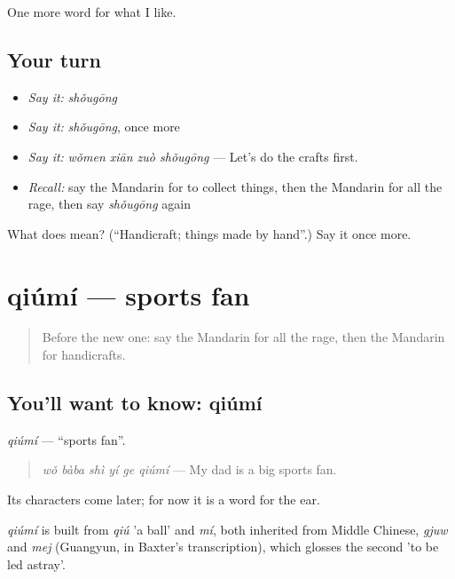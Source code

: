 \begin{grammarlens}[title={What you've built}]
One more word for what I like.
\end{grammarlens}

\subsection*{Your turn}
\begin{itemize}
\raggedright
  \item \emph{Say it:} \emph{shǒugōng}
  \item \emph{Say it:} \emph{shǒugōng}, once more
  \item \emph{Say it:} \emph{wǒmen xiān zuò shǒugōng} — Let's do the crafts first.
  \item \emph{Recall:} say the Mandarin for to collect things, then the Mandarin for all the rage, then say \emph{shǒugōng} again
\end{itemize}

\begin{tcolorbox}[breakable,colback=teal!4,colframe=teal!35!black,title={Before you move on}]
What does  mean? (\textquotedblleft{}Handicraft; things made by hand\textquotedblright{}.) Say it once more.
\end{tcolorbox}
\section[qiúmí]{qiúmí — sports fan}

\label{lesson:ZH-C274-qiumi}



\begin{quote}
Before the new one: say the Mandarin for all the rage, then the Mandarin for handicrafts.
\end{quote}

\subsection*{You'll want to know: qiúmí}
\emph{qiúmí} — \textquotedblleft{}sports fan\textquotedblright{}.

\begin{quote}
\emph{wǒ bàba shì yí ge qiúmí} — My dad is a big sports fan.
\end{quote}

Its characters come later; for now it is a word for the ear.

\begin{cousinweb}
\emph{qiúmí} is built from \emph{qiú} 'a ball' and \emph{mí}, both inherited from Middle Chinese, \emph{gjuw} and \emph{mej} (Guangyun, in Baxter's transcription), which glosses the second 'to be led astray'.
\end{cousinweb}

